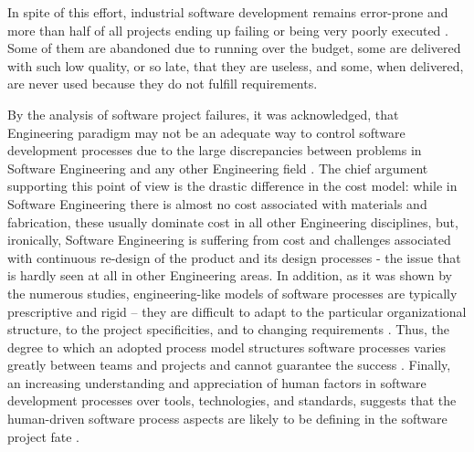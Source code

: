 In spite of this effort, industrial software development remains error-prone and more than half of all 
projects ending up failing or being very poorly executed \cite{chaos2006}.
Some of them are abandoned due to running over the budget, some are delivered with such low quality, 
or so late, that they are useless, and some, when delivered, are never used because they do not 
fulfill requirements. 

By the analysis of software project failures, it was acknowledged, that Engineering paradigm 
may not be an adequate way to control software development processes due to the large discrepancies 
between problems in Software Engineering and any other Engineering field 
\cite{citeulike:3729379} \cite{citeulike:5203446} \cite{citeulike:2207657} \cite{citeulike:12550665}.
The chief argument supporting this point of view is the drastic difference in the cost model:
while in Software Engineering there is almost no cost associated with materials and fabrication, 
these usually dominate cost in all other Engineering disciplines, but, ironically, 
Software Engineering is suffering from cost and challenges associated with 
continuous re-design of the product and its design processes - the issue that is 
hardly seen at all in other Engineering areas. 
In addition, as it was shown by the numerous studies, engineering-like models of software processes 
are typically prescriptive and rigid -- they are difficult to adapt to the particular organizational 
structure, to the project specificities, and to changing requirements \cite{citeulike:113403}. 
Thus, the degree to which an adopted process model structures software processes varies greatly 
between teams and projects and cannot guarantee the success \cite{sacchi_2001}. 
Finally, an increasing understanding and appreciation of human factors in software development 
processes over tools, technologies, and standards, suggests that the human-driven software 
process aspects are likely to be defining in the software project fate \cite{citeulike:6580825} 
\cite{citeulike:149387} \cite{1605185} \cite{citeulike:113403} \cite{citeulike:12743107}. 


